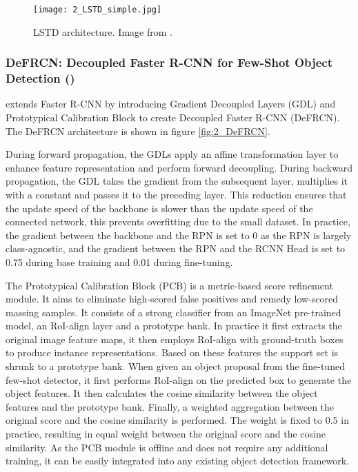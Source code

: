 \begin{figure}[h]
	\centering
	\texttt{[image: 2\_LSTD\_simple.jpg]}
	\caption{\label{fig:2_LSTD} LSTD architecture. Image from \citet{LSTD}.}
\end{figure}

\subsubsection{DeFRCN: Decoupled Faster R-CNN for Few-Shot Object Detection (\citet{DeFRCN})}
\citet{DeFRCN} extends Faster R-CNN\cite{fasterrcnn} by introducing Gradient Decoupled Layers (GDL) and Prototypical Calibration Block to create Decoupled Faster R-CNN (DeFRCN). The DeFRCN architecture is shown in figure \ref{fig:2_DeFRCN}.

During forward propagation, the GDLs apply an affine transformation layer to enhance feature representation and perform forward decoupling. During backward propagation, the GDL takes the gradient from the subsequent layer, multiplies it with a constant and passes it to the preceding layer. This reduction ensures that the update speed of the backbone is slower than the update speed of the connected network, this prevents overfitting due to the small dataset. In practice, the gradient between the backbone and the RPN is set to 0 as the RPN is largely class-agnostic, and the gradient between the RPN and the RCNN Head is set to 0.75 during base training and 0.01 during fine-tuning.

The Prototypical Calibration Block (PCB) is a metric-based score refinement module. It aims to eliminate high-scored false positives and remedy low-scored massing samples. It consists of a strong classifier from an ImageNet pre-trained model, an RoI-align layer and a prototype bank. In practice it first extracts the original image feature maps, it then employs RoI-align with ground-truth boxes to produce instance representations. Based on these features the support set is shrunk to a prototype bank. When given an object proposal from the fine-tuned few-shot detector, it first performs RoI-align on the predicted box to generate the object features. It then calculates the cosine similarity between the object features and the prototype bank. Finally, a weighted aggregation between the original score and the cosine similarity is performed. The weight is fixed to 0.5 in practice, resulting in equal weight between the original score and the cosine similarity. As the PCB module is offline and does not require any additional training, it can be easily integrated into any existing object detection framework.

